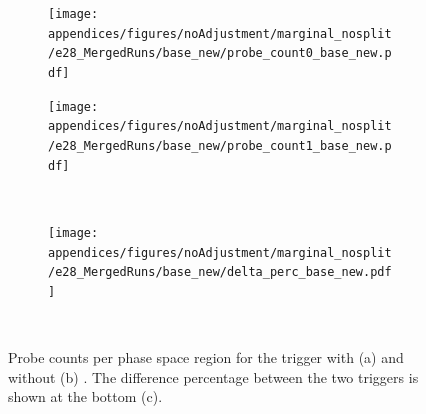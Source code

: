 \begin{figure}[b]
\begin{center}
\begin{subfigure}[c]{.48\textwidth}
\centering
\texttt{[image: appendices/figures/noAdjustment/marginal\_nosplit/e28\_MergedRuns/base\_new/probe\_count0\_base\_new.pdf]}
\caption{}%
\label{fig:gof_counts_without_ringer}
\end{subfigure}
\begin{subfigure}[c]{.48\textwidth}
\centering
\texttt{[image: appendices/figures/noAdjustment/marginal\_nosplit/e28\_MergedRuns/base\_new/probe\_count1\_base\_new.pdf]}
\caption{}%
\label{fig:gof_counts_with_ringer}
\end{subfigure} \\
\hspace*{\fill}
\begin{subfigure}[c]{.48\textwidth}
\centering
\texttt{[image: appendices/figures/noAdjustment/marginal\_nosplit/e28\_MergedRuns/base\_new/delta\_perc\_base\_new.pdf]}
\caption{}%
\label{fig:gof_delta_perc}
\end{subfigure}
\hspace*{\fill} \\
\caption{%
  Probe counts per phase space region for the trigger with (a) and without (b)
  \rnn{}. The difference percentage between the two triggers is shown at the
  bottom (c).
}%
\label{fig:gof_counts}
\end{center}
\end{figure}

